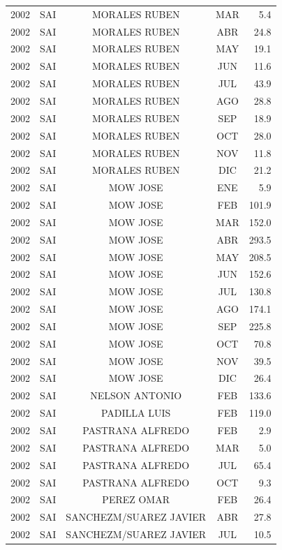 \documentclass[12pt,]{article}
\begin{document}
\begin{table}[ht]
{\begin{tabular}{lcccr}
  2002 & SAI & MORALES RUBEN & MAR & 5.4 \\ 
  2002 & SAI & MORALES RUBEN & ABR & 24.8 \\ 
  2002 & SAI & MORALES RUBEN & MAY & 19.1 \\ 
  2002 & SAI & MORALES RUBEN & JUN & 11.6 \\ 
  2002 & SAI & MORALES RUBEN & JUL & 43.9 \\ 
  2002 & SAI & MORALES RUBEN & AGO & 28.8 \\ 
  2002 & SAI & MORALES RUBEN & SEP & 18.9 \\ 
  2002 & SAI & MORALES RUBEN & OCT & 28.0 \\ 
  2002 & SAI & MORALES RUBEN & NOV & 11.8 \\ 
  2002 & SAI & MORALES RUBEN & DIC & 21.2 \\ 
  2002 & SAI & MOW JOSE & ENE & 5.9 \\ 
  2002 & SAI & MOW JOSE & FEB & 101.9 \\ 
  2002 & SAI & MOW JOSE & MAR & 152.0 \\ 
  2002 & SAI & MOW JOSE & ABR & 293.5 \\ 
  2002 & SAI & MOW JOSE & MAY & 208.5 \\ 
  2002 & SAI & MOW JOSE & JUN & 152.6 \\ 
  2002 & SAI & MOW JOSE & JUL & 130.8 \\ 
  2002 & SAI & MOW JOSE & AGO & 174.1 \\ 
  2002 & SAI & MOW JOSE & SEP & 225.8 \\ 
  2002 & SAI & MOW JOSE & OCT & 70.8 \\ 
  2002 & SAI & MOW JOSE & NOV & 39.5 \\ 
  2002 & SAI & MOW JOSE & DIC & 26.4 \\ 
  2002 & SAI & NELSON ANTONIO & FEB & 133.6 \\ 
  2002 & SAI & PADILLA LUIS & FEB & 119.0 \\ 
  2002 & SAI & PASTRANA ALFREDO & FEB & 2.9 \\ 
  2002 & SAI & PASTRANA ALFREDO & MAR & 5.0 \\ 
  2002 & SAI & PASTRANA ALFREDO & JUL & 65.4 \\ 
  2002 & SAI & PASTRANA ALFREDO & OCT & 9.3 \\ 
  2002 & SAI & PEREZ OMAR & FEB & 26.4 \\ 
  2002 & SAI & SANCHEZM/SUAREZ JAVIER & ABR & 27.8 \\ 
  2002 & SAI & SANCHEZM/SUAREZ JAVIER & JUL & 10.5 \\ 

\end{tabular}}
\end{table}
\end{document}
